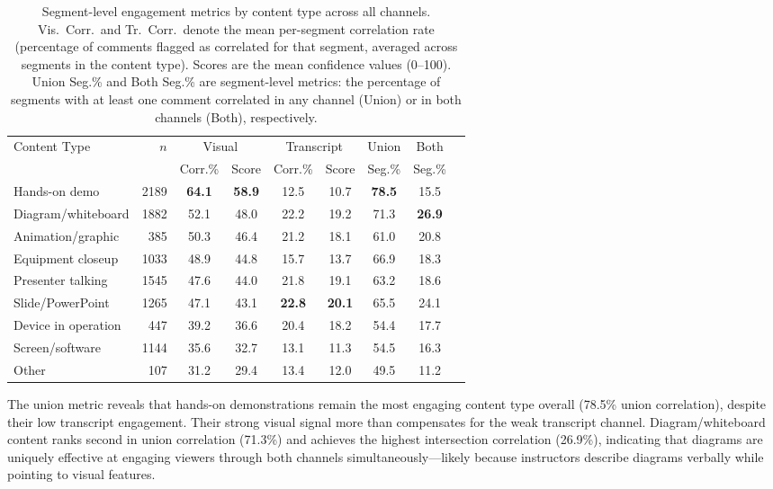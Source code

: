 \documentclass[fleqn,10pt]{wlscirep}
\begin{document}
\begin{table}[ht]
    \centering
    \caption{Segment-level engagement metrics by content type across all channels. Vis.\ Corr.\ and Tr.\ Corr.\ denote the mean per-segment correlation rate (percentage of comments flagged as correlated for that segment, averaged across segments in the content type). Scores are the mean confidence values (0--100). Union Seg.\% and Both Seg.\% are segment-level metrics: the percentage of segments with at least one comment correlated in any channel (Union) or in both channels (Both), respectively.}
    \label{tab:engagement_by_content}
    \begin{tabular}{lrccccccc}
        \toprule
        Content Type & $n$ & \multicolumn{2}{c}{Visual} & \multicolumn{2}{c}{Transcript} & Union & Both \\
        \cmidrule(lr){3-4} \cmidrule(lr){5-6}
        & & Corr.\% & Score & Corr.\% & Score & Seg.\% & Seg.\% \\
        \midrule
        Hands-on demo & 2189 & \textbf{64.1} & \textbf{58.9} & 12.5 & 10.7 & \textbf{78.5} & 15.5 \\
        Diagram/whiteboard & 1882 & 52.1 & 48.0 & 22.2 & 19.2 & 71.3 & \textbf{26.9} \\
        Animation/graphic & 385 & 50.3 & 46.4 & 21.2 & 18.1 & 61.0 & 20.8 \\
        Equipment closeup & 1033 & 48.9 & 44.8 & 15.7 & 13.7 & 66.9 & 18.3 \\
        Presenter talking & 1545 & 47.6 & 44.0 & 21.8 & 19.1 & 63.2 & 18.6 \\
        Slide/PowerPoint & 1265 & 47.1 & 43.1 & \textbf{22.8} & \textbf{20.1} & 65.5 & 24.1 \\
        Device in operation & 447 & 39.2 & 36.6 & 20.4 & 18.2 & 54.4 & 17.7 \\
        Screen/software & 1144 & 35.6 & 32.7 & 13.1 & 11.3 & 54.5 & 16.3 \\
        Other & 107 & 31.2 & 29.4 & 13.4 & 12.0 & 49.5 & 11.2 \\
        \bottomrule
    \end{tabular}
\end{table}

The union metric reveals that hands-on demonstrations remain the most engaging content type overall (78.5\% union correlation), despite their low transcript engagement. Their strong visual signal more than compensates for the weak transcript channel. Diagram/whiteboard content ranks second in union correlation (71.3\%) and achieves the highest intersection correlation (26.9\%), indicating that diagrams are uniquely effective at engaging viewers through both channels simultaneously---likely because instructors describe diagrams verbally while pointing to visual features.
\end{document}
